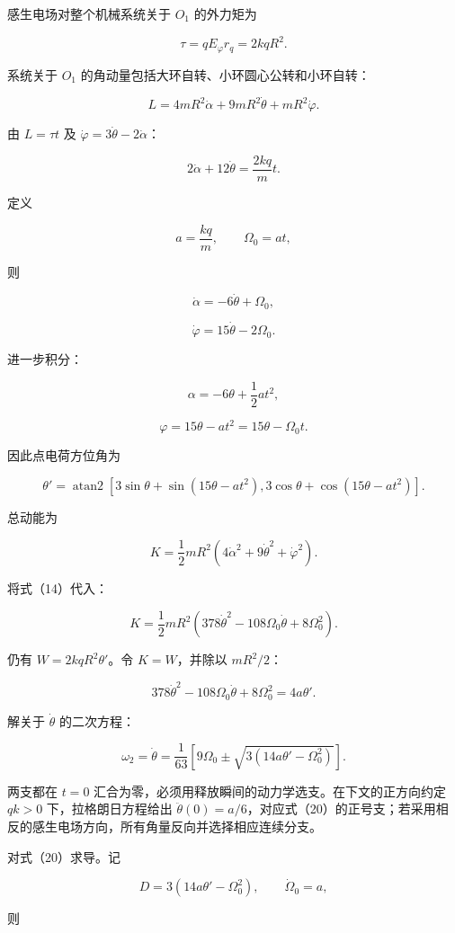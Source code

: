 \documentclass[12pt,a4paper,UTF8]{ctexart}
\begin{document}
感生电场对整个机械系统关于 \(O_1\) 的外力矩为

\[\tau=qE_\varphi r_q=2kqR^2. \tag{12}\]

系统关于 \(O_1\) 的角动量包括大环自转、小环圆心公转和小环自转：

\[L=4mR^2\dot\alpha+9mR^2\dot\theta+mR^2\dot\varphi. \tag{13}\]

由 \(L=\tau t\) 及 \(\dot\varphi=3\dot\theta-2\dot\alpha\)：

\[2\dot\alpha+12\dot\theta=\frac{2kq}{m}t.\]

定义

\[a=\frac{kq}{m},\qquad \Omega_0=at,\]

则

\[\boxed{\dot\alpha=-6\dot\theta+\Omega_0},\]

\[\boxed{\dot\varphi=15\dot\theta-2\Omega_0}. \tag{14}\]

进一步积分：

\[\alpha=-6\theta+\frac12at^2,\]

\[\varphi=15\theta-at^2=15\theta-\Omega_0t. \tag{15}\]

因此点电荷方位角为

\[\boxed{
\theta'=\operatorname{atan2}
\left[3\sin\theta+\sin(15\theta-at^2),
3\cos\theta+\cos(15\theta-at^2)
\right]
}. \tag{16}\]

总动能为

\[K=\frac12mR^2
\left(4\dot\alpha^2+9\dot\theta^2+\dot\varphi^2\right). \tag{17}\]

将式（14）代入：

\[K=\frac12mR^2
\left(378\dot\theta^2-108\Omega_0\dot\theta+8\Omega_0^2\right). \tag{18}\]

仍有 \(W=2kqR^2\theta'\)。令 \(K=W\)，并除以 \(mR^2/2\)：

\[378\dot\theta^2-108\Omega_0\dot\theta+8\Omega_0^2
=4a\theta'. \tag{19}\]

解关于 \(\dot\theta\) 的二次方程：

\[\boxed{
\omega_2=\dot\theta
=\frac1{63}\left[
9\Omega_0\pm\sqrt{3(14a\theta'-\Omega_0^2)}
\right]
}. \tag{20}\]

两支都在 \(t=0\)
汇合为零，必须用释放瞬间的动力学选支。在下文的正方向约定 \(qk>0\)
下，拉格朗日方程给出
\(\ddot\theta(0)=a/6\)，对应式（20）的正号支；若采用相反的感生电场方向，所有角量反向并选择相应连续分支。

对式（20）求导。记

\[D=3(14a\theta'-\Omega_0^2),\qquad \dot\Omega_0=a,\]

则
\end{document}
